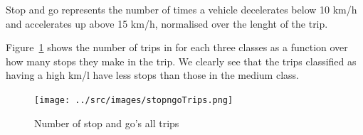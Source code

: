 Stop and go represents the number of times a vehicle decelerates below 10 km/h and accelerates up above 15 km/h, normalised over the lenght of the trip.

Figure~\ref{fig:stopngoTrips} shows the number of trips in for each three classes as a function over how many stops they make in the trip.
We clearly see that the trips classified as having a high km/l have less stops than those in the medium class.

\begin{figure}
\centering
\texttt{[image: ../src/images/stopngoTrips.png]}
\caption{Number of stop and go's all trips}
\label{fig:stopngoTrips}
\end{figure}
